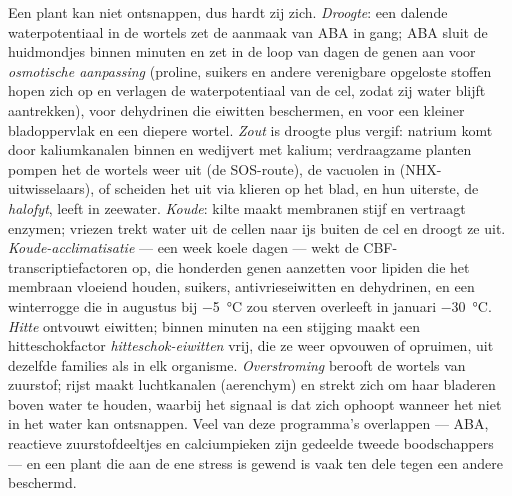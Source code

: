 \begin{definition}\label{def:b3:plant-molecular-physiology:abiotic}
Een plant kan niet ontsnappen, dus hardt zij zich. \emph{Droogte}: een
dalende waterpotentiaal in de wortels zet de aanmaak van ABA in gang;
ABA sluit de huidmondjes binnen minuten en zet in de loop van dagen de
genen aan voor \emph{osmotische aanpassing} (proline, suikers en andere
verenigbare opgeloste stoffen hopen zich op en verlagen de
waterpotentiaal van de cel, zodat zij water blijft aantrekken), voor
dehydrinen die eiwitten beschermen, en voor een kleiner bladoppervlak
en een diepere wortel. \emph{Zout} is droogte plus vergif: natrium komt
door kaliumkanalen binnen en wedijvert met kalium; verdraagzame planten
pompen het de wortels weer uit (de SOS-route), de vacuolen in
(NHX-uitwisselaars), of scheiden het uit via klieren op het blad, en
hun uiterste, de \emph{halofyt}, leeft in zeewater. \emph{Koude}: kilte
maakt membranen stijf en vertraagt enzymen; vriezen trekt water uit de
cellen naar ijs buiten de cel en droogt ze uit.
\emph{Koude-acclimatisatie} --- een week koele dagen --- wekt de
CBF-transcriptiefactoren op, die honderden genen aanzetten voor lipiden
die het membraan vloeiend houden, suikers, antivrieseiwitten en
dehydrinen, en een winterrogge die in augustus bij \qty{-5}{\celsius}
zou sterven overleeft in januari \qty{-30}{\celsius}. \emph{Hitte}
ontvouwt eiwitten; binnen minuten na een stijging maakt een
hitteschokfactor \emph{hitteschok-eiwitten} vrij,  die ze
weer opvouwen of opruimen, uit dezelfde families als in elk organisme.
\emph{Overstroming} berooft de wortels van zuurstof; rijst maakt
luchtkanalen (aerenchym) en strekt zich om haar bladeren boven water te
houden, waarbij  het signaal is dat zich ophoopt wanneer het
niet in het water kan ontsnappen. Veel van deze programma's overlappen
--- ABA, reactieve zuurstofdeeltjes en calciumpieken zijn gedeelde
tweede boodschappers --- en een plant die aan de ene stress is gewend
is vaak ten dele tegen een andere beschermd.
\end{definition}

